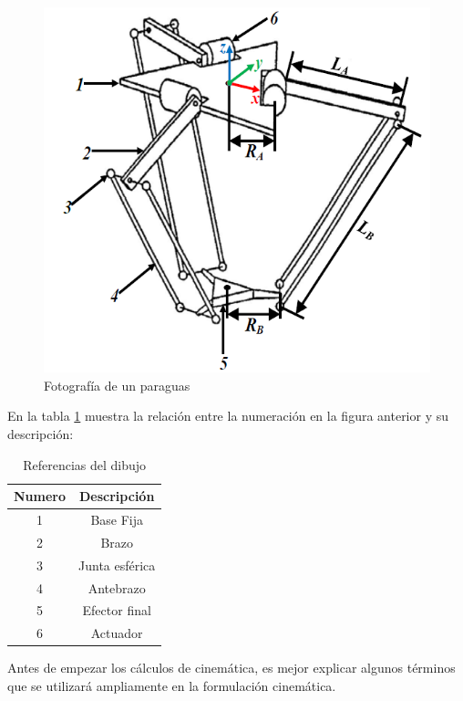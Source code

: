             \begin{figure}[htb]
                 \centering
                 \includegraphics[width=0.5\linewidth]{Main/Chapter4/Images4/Metodo_B_Modelacion_Cinematica_Posicion_1.png}
                  \caption{Fotografía de un paraguas}
                  \label{f:Cap4_Metodo_B_Modelacion_Cinematica_Posicion_1}
            \end{figure}        
        
        
        En la tabla \ref{tab:cap4_tabla_11} muestra la relación entre la numeración en la figura anterior y su descripción:
        
        
        \begin{table}[h]
            \centering
            \begin{tabular}{c c}
            \hline
                \textbf{Numero}& \textbf{Descripción} \\ 
            \hline             \hline
             1 & Base Fija \\
            \hline
             2 & Brazo \\
            \hline
             3 & Junta esférica \\
            \hline
             4 & Antebrazo\\
            \hline
             5 & Efector final \\
             \hline
             6 & Actuador \\
             \hline
            \end{tabular}
           \caption{Referencias del dibujo}
           \label{tab:cap4_tabla_11}
        \end{table}
        
        
        \newpage

        Antes de empezar los cálculos de cinemática, es mejor explicar algunos términos que se utilizará ampliamente en la formulación cinemática.
        
